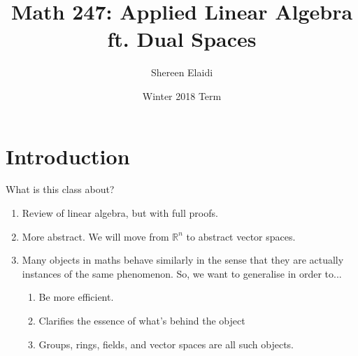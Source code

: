 \documentclass[11pt]{scrartcl}
\title{\textbf{Math 247: Applied Linear Algebra ft. Dual Spaces}}
\author{Shereen Elaidi}
\date{Winter 2018 Term}
\newcommand{\R}[0]{\mathbb{R}}
\theoremstyle{definition}
\theoremstyle{remark}
\begin{document}
\maketitle
\tableofcontents

\section{Introduction}
What is this class about? 
\begin{enumerate}[noitemsep]
	\item Review of linear algebra, but with full proofs. 
	\item More abstract. We will move from $\R^n$ to abstract vector spaces. 
	\item Many objects in maths behave similarly in the sense that they are actually instances of the same phenomenon. So, we want to generalise in order to...
	\begin{enumerate}[noitemsep]
		\item Be more efficient. 
		\item Clarifies the essence of what's behind the object
		\item Groups, rings, fields, and vector spaces are all such objects. 
	\end{enumerate}
\end{enumerate}
\end{document}
